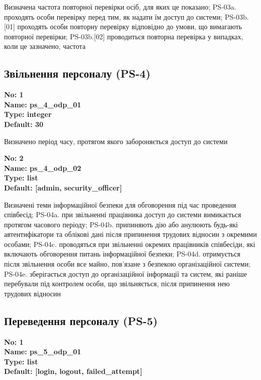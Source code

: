 \documentclass{article}
\begin{document}
{\footnotesize Визначена частота повторної перевірки осіб, для яких це показано; PS-03a. проходять особи перевірку перед тим, як надати їм доступ до системи; PS-03b.[01] проходять особи повторну перевірку відповідно до умови, що вимагають повторної перевірки; PS-03b.[02] проводиться повторна перевірка у випадках, коли це зазначено, частота}




\subsection{Звільнення персоналу (PS-4)}


\vspace{10pt}
{\footnotesize\bfseries
No: 1\\
Name: ps\_\allowbreak{}4\_\allowbreak{}odp\_\allowbreak{}01\\
Type: integer\\
Default: 30
}

{\footnotesize Визначено період часу, протягом якого забороняється доступ до системи}


{\footnotesize\bfseries
No: 2\\
Name: ps\_\allowbreak{}4\_\allowbreak{}odp\_\allowbreak{}02\\
Type: list\\
Default: [\textquotedbl{}admin\textquotedbl{}, \textquotedbl{}security\_\allowbreak{}officer\textquotedbl{}]
}

{\footnotesize Визначені теми інформаційної безпеки для обговорення під час проведення співбесід; PS-04a. при звільненні працівника доступ до системи вимикається протягом часового періоду; PS-04b. припиняють дію або анулюють будь-які автентифікатори та облікові дані після припинення трудових відносин з окремими особами; PS-04c. проводяться при звільненні окремих працівників співбесіди, які включають обговорення питань інформаційної безпеки; PS-04d. отримується після звільнення особи все майно, пов'язане з безпекою організаційної системи; PS-04e. зберігається доступ до організаційної інформації та систем, які раніше перебували під контролем особи, що звільняється, після припинення нею трудових відносин}




\subsection{Переведення персоналу (PS-5)}


\vspace{10pt}
{\footnotesize\bfseries
No: 1\\
Name: ps\_\allowbreak{}5\_\allowbreak{}odp\_\allowbreak{}01\\
Type: list\\
Default: [\textquotedbl{}login\textquotedbl{}, \textquotedbl{}logout\textquotedbl{}, \textquotedbl{}failed\_\allowbreak{}attempt\textquotedbl{}]
}
\end{document}
